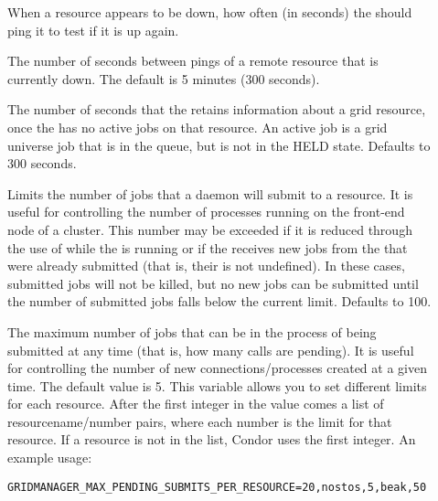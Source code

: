 \begin{description}
\item[]
\label{param:GridmanagerResourceProbeInterval}
When a resource appears to be down, how often (in seconds) the
should ping it to test if it is up again.

\item[]
\label{param:GridmanagerResourceProbeDelay} The number of seconds
between pings of a remote resource that is currently down. The default
is 5 minutes (300 seconds).

\item[]
  \label{param:GridmanagerEmptyResourceDelay} The number of seconds
  that the  retains information about a grid
  resource, once the  has no active jobs
  on that resource.
  An active job is a grid universe job that is in the queue,
  but is not in the HELD state.
  Defaults to 300 seconds.

\item[]
\label{param:GridmanagerMaxSubmittedJobsPerResource}
Limits the number of jobs
that a  daemon will submit to a resource.
It is useful for controlling the number of 
processes running on the front-end node of a cluster.
This number may be exceeded if it is reduced through the use
of  while the  is running
or if the  receives new
jobs from the  that were already submitted
(that is, their  is not undefined).
In these cases, submitted jobs will not be killed,
but no new jobs can be submitted until the number of submitted
jobs falls below the current limit.
Defaults to 100.

\item[]
\label{param:GridmanagerMaxPendingSubmitsPerResource} The maximum
number of jobs
that can be in the process of being submitted at any time (that is,
how many  calls are pending).
It is useful for controlling the number of new
connections/processes created at a given time.
The default value is 5.
This variable allows
you to set different limits for each resource.
After the first integer in the value
comes a list of resourcename/number pairs,
where each number is the limit for that resource.
If a resource is not in the list,
Condor uses the first integer.
An example usage:
\begin{verbatim}
GRIDMANAGER_MAX_PENDING_SUBMITS_PER_RESOURCE=20,nostos,5,beak,50
\end{verbatim}


\end{description}

